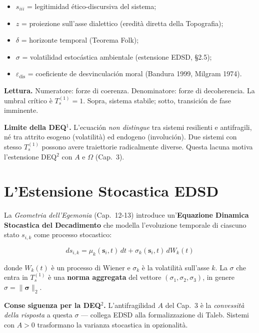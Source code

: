 \begin{itemize}
\tightlist
\item
  \(s_{iii}\) = legitimidad ético-discursiva del sistema;
\item
  \(z\) = proiezione sull'asse dialettico (eredità diretta della
  Topografia);
\item
  \(\delta\) = horizonte temporal (Teorema Folk);
\item
  \(\sigma\) = volatilidad estocástica ambientale (estensione EDSD, \S{}2.5);
\item
  \(\varepsilon_{\text{dis}}\) = coeficiente de desvinculación moral
  (Bandura 1999, Milgram 1974).
\end{itemize}

\Proved{} \textbf{Lettura.} Numeratore: forze di coerenza. Denominatore:
forze di decoherencia. La umbral crítico è \(T_s^{(1)} = 1\). Sopra,
sistema stabile; sotto, transición de fase imminente.

\Conj{} \textbf{Limite della DEQ$^1$.} L'ecuación \emph{non distingue} tra
sistemi resilienti e antifragili, né tra attrito esogeno (volatilità) ed
endogeno (involución). Due sistemi con stesso \(T_s^{(1)}\) possono
avere traiettorie radicalmente diverse. Questa lacuna motiva
l'estensione DEQ$^2$ con \(A\) e \(\Omega\) (Cap.~3).



\section{L'Estensione Stocastica
EDSD}\label{lestensione-stocastica-edsd}

La \emph{Geometria dell'Egemonia} (Cap.~12-13) introduce
un'\textbf{Equazione Dinamica Stocastica del Decadimento} che modella
l'evoluzione temporale di ciascuno stato \(s_{i,k}\) come processo
stocastico:

\[
ds_{i,k} = \mu_k(\mathbf{s}_i, t)\, dt + \sigma_k(\mathbf{s}_i, t)\, dW_k(t)
\]

donde \(W_k(t)\) è un processo di Wiener e \(\sigma_k\) è la volatilità
sull'asse \(k\). La \(\sigma\) che entra in \(T_s^{(1)}\) è una
\textbf{norma aggregata} del vettore \((\sigma_1, \sigma_2, \sigma_3)\),
in genere \(\sigma = \|\boldsymbol{\sigma}\|_2\).

\Hypoth{} \textbf{Conse siguenza per la DEQ$^2$.} L'antifragilidad \(A\) del
Cap.~3 è la \emph{convessità della risposta} a questa \(\sigma\) ---
collega EDSD alla formalizzazione di Taleb. Sistemi con \(A > 0\)
trasformano la varianza stocastica in opzionalità.



